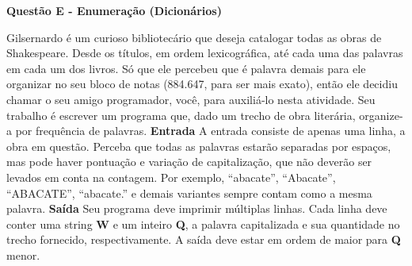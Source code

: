 \documentclass[a4paper, 12pt]{article}
\begin{document}
\newpage %
\begin{center}
\textbf{{\Large Questão E - Enumeração (Dicionários)}}
\end{center}
\vspace{5pt}
Gilsernardo é um curioso bibliotecário que deseja catalogar todas as obras de
Shakespeare. Desde os títulos, em ordem lexicográfica, até cada uma das
palavras em cada um dos livros. Só que ele percebeu que é palavra demais para
ele organizar no seu bloco de notas (884.647, para ser mais exato), então ele
decidiu chamar o seu amigo programador, você, para auxiliá-lo nesta atividade. \newline \newline
Seu trabalho é escrever um programa que, dado um trecho de obra literária,
organize-a por frequência de palavras.
\newline \newline
\textbf{{\large Entrada}} \newline
A entrada consiste de apenas uma linha, a obra em questão. Perceba que todas as
palavras estarão separadas por espaços, mas pode haver pontuação e variação de
capitalização, que não deverão ser levados em conta na contagem. Por exemplo,
``abacate'', ``Abacate'', ``ABACATE'', ``abacate.'' e demais variantes sempre contam
como a mesma palavra.
\newline \newline
\textbf{{\large Saída}} \newline
Seu programa deve imprimir múltiplas linhas. Cada linha deve conter uma string \textbf{W}
e um inteiro \textbf{Q}, a palavra capitalizada e sua quantidade no trecho fornecido,
respectivamente. A saída deve estar em ordem de  maior para \textbf{Q} menor.
\end{document}
